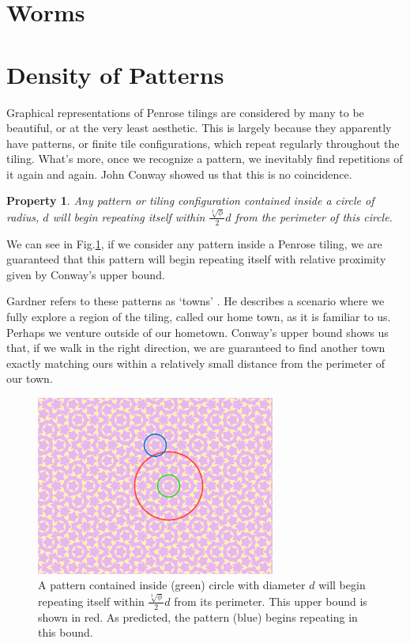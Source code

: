 \documentclass[
  oneside,
  11pt, a4paper,
  footinclude=true,
  headinclude=true,
  cleardoublepage=empty
]{scrbook}
\newtheorem{myprop}{Property}
\begin{document}
\section{Worms} 
\section{Density of Patterns}
Graphical representations of Penrose tilings are considered by many to be beautiful, or at the very least aesthetic. This is largely because they apparently have patterns, or finite tile configurations, which repeat regularly throughout the tiling. What's more, once we recognize a pattern, we inevitably find repetitions of it again and again. John Conway showed us that this is no coincidence.

\begin{myprop}
Any pattern or tiling configuration contained inside a circle of radius, $d$ will begin repeating itself within $\frac{\sqrt[3]{\phi}}{2}d$ from the perimeter of this circle. \cite{Gardner1997}
\end{myprop}

We can see in Fig.\ref{fig:patternfind}, if we consider any pattern inside a Penrose tiling, we are guaranteed that this pattern will begin repeating itself with relative proximity given by Conway's upper bound. 

Gardner refers to these patterns as `towns' \cite{Gardner1997}. He describes a scenario where we fully explore a region of the tiling, called our home town, as it is familiar to us. Perhaps we venture outside of our hometown. Conway's upper bound shows us that, if we walk in the right direction, we are guaranteed to find another town exactly matching ours within a relatively small distance from the perimeter of our town.

\begin{figure}
\centering
\includegraphics[width=0.7\textwidth]{PatternFind3}
\caption{A pattern contained inside (green) circle with diameter $d$ will begin repeating itself within $\frac{\sqrt[3]{\phi}}{2}d$ from its perimeter. This upper bound is shown in red. As predicted, the pattern (blue) begins repeating in this bound.}
\label{fig:patternfind}
\end{figure}
\end{document}
